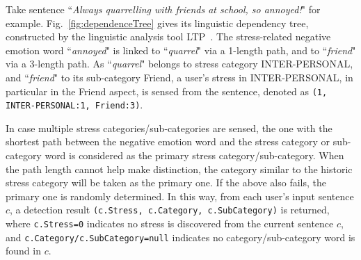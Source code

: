 \begin{example}
Take sentence ``\emph{Always quarrelling with friends at school, so annoyed!}"  for example.
Fig.~\ref{fig:dependenceTree} gives its linguistic dependency tree, constructed by the
linguistic analysis tool LTP~\cite{Che10}.
The stress-related negative emotion word ``\emph{annoyed}" is linked to
``\emph{quarrel}" via a 1-length path, and to
``\emph{friend}" via a 3-length path.
As ``\emph{quarrel}" belongs to stress category INTER-PERSONAL,
and ``\emph{friend}" to its sub-category Friend, a user's stress in INTER-PERSONAL,
in particular in the Friend aspect, is sensed from the sentence, denoted
as \texttt{(1, INTER-PERSONAL:1, Friend:3)}.
\end{example}

In case multiple stress categories/sub-categories are sensed,
the one with the shortest path between the negative emotion word and
the stress category or sub-category word is considered as the primary stress category/sub-category.
When the path length cannot help make distinction, the category similar to the
historic stress category will be taken as the primary one.
If the above also fails, the primary one is randomly determined.
In this way, from each user's input sentence $c$, a detection result
\texttt{(c.Stress, c.Category, c.SubCategory)} is returned, where
\texttt{c.Stress=0} indicates no stress is discovered from the current sentence $c$, and
\texttt{c.Category/c.SubCategory=null} indicates no category/sub-category word is found in $c$.

